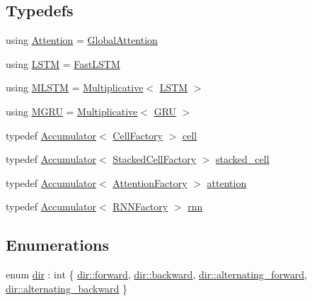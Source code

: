\subsection*{Typedefs}
\begin{DoxyCompactItemize}
\item 
using \hyperlink{namespacemarian_1_1rnn_ae9586d2236bd64dae0a644c58d9fc76e}{Attention} = \hyperlink{classmarian_1_1rnn_1_1GlobalAttention}{Global\+Attention}
\item 
using \hyperlink{namespacemarian_1_1rnn_a386737951397fd1835581e82809f052a}{L\+S\+TM} = \hyperlink{classmarian_1_1rnn_1_1FastLSTM}{Fast\+L\+S\+TM}
\item 
using \hyperlink{namespacemarian_1_1rnn_a183afd65ecbacf38477504074a793fa8}{M\+L\+S\+TM} = \hyperlink{classmarian_1_1rnn_1_1Multiplicative}{Multiplicative}$<$ \hyperlink{namespacemarian_1_1rnn_a386737951397fd1835581e82809f052a}{L\+S\+TM} $>$
\item 
using \hyperlink{namespacemarian_1_1rnn_aa3f59f19b6e405cf6f4671cc027fcf7a}{M\+G\+RU} = \hyperlink{classmarian_1_1rnn_1_1Multiplicative}{Multiplicative}$<$ \hyperlink{classmarian_1_1rnn_1_1GRU}{G\+RU} $>$
\item 
typedef \hyperlink{classmarian_1_1Accumulator}{Accumulator}$<$ \hyperlink{classmarian_1_1rnn_1_1CellFactory}{Cell\+Factory} $>$ \hyperlink{namespacemarian_1_1rnn_af723e51535e0b11de5b28fe19627a3fb}{cell}
\item 
typedef \hyperlink{classmarian_1_1Accumulator}{Accumulator}$<$ \hyperlink{classmarian_1_1rnn_1_1StackedCellFactory}{Stacked\+Cell\+Factory} $>$ \hyperlink{namespacemarian_1_1rnn_a55385034d5ad19187245bb2b564cb7eb}{stacked\+\_\+cell}
\item 
typedef \hyperlink{classmarian_1_1Accumulator}{Accumulator}$<$ \hyperlink{classmarian_1_1rnn_1_1AttentionFactory}{Attention\+Factory} $>$ \hyperlink{namespacemarian_1_1rnn_a57316dc4c756edb2a8dfabea7e50d92b}{attention}
\item 
typedef \hyperlink{classmarian_1_1Accumulator}{Accumulator}$<$ \hyperlink{classmarian_1_1rnn_1_1RNNFactory}{R\+N\+N\+Factory} $>$ \hyperlink{namespacemarian_1_1rnn_aff1b115e415945b445f8d4a2068ec3e8}{rnn}
\end{DoxyCompactItemize}
\subsection*{Enumerations}
\begin{DoxyCompactItemize}
\item 
enum \hyperlink{namespacemarian_1_1rnn_acba2ce4446fe9654f1fd2c69793e34ca}{dir} \+: int \{ \hyperlink{namespacemarian_1_1rnn_acba2ce4446fe9654f1fd2c69793e34caa965dbaac085fc891bfbbd4f9d145bbc8}{dir\+::forward}, 
\hyperlink{namespacemarian_1_1rnn_acba2ce4446fe9654f1fd2c69793e34caa195fe59b6f103787a914aead0f3db502}{dir\+::backward}, 
\hyperlink{namespacemarian_1_1rnn_acba2ce4446fe9654f1fd2c69793e34caad6b112d6a37f8db13390a2126c6062db}{dir\+::alternating\+\_\+forward}, 
\hyperlink{namespacemarian_1_1rnn_acba2ce4446fe9654f1fd2c69793e34caa1ed5c7d56d5fcbea1a3d07070a447bbd}{dir\+::alternating\+\_\+backward}
 \}
\end{DoxyCompactItemize}
